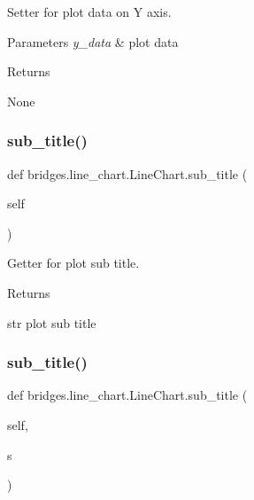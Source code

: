 Setter for plot data on Y axis. 


\begin{DoxyParams}{Parameters}
{\em y\+\_\+data} & plot data \\
\hline
\end{DoxyParams}
\begin{DoxyReturn}{Returns}


None 
\end{DoxyReturn}
\mbox{\label{classbridges_1_1line__chart_1_1_line_chart_a3361674c961f45bfa058cff38ba49bd8}} 
\subsubsection{\texorpdfstring{sub\_title()}{sub\_title()}\hspace{0.1cm}{\footnotesize\ttfamily [1/2]}}
{\footnotesize\ttfamily def bridges.\+line\+\_\+chart.\+Line\+Chart.\+sub\+\_\+title (\begin{DoxyParamCaption}\item[{}]{self }\end{DoxyParamCaption})}



Getter for plot sub title. 

\begin{DoxyReturn}{Returns}


str plot sub title 
\end{DoxyReturn}
\mbox{\label{classbridges_1_1line__chart_1_1_line_chart_ac26e0a4de0438a5463ba5dca95d2b0a3}} 
\subsubsection{\texorpdfstring{sub\_title()}{sub\_title()}\hspace{0.1cm}{\footnotesize\ttfamily [2/2]}}
{\footnotesize\ttfamily def bridges.\+line\+\_\+chart.\+Line\+Chart.\+sub\+\_\+title (\begin{DoxyParamCaption}\item[{}]{self,  }\item[{}]{s }\end{DoxyParamCaption})}



